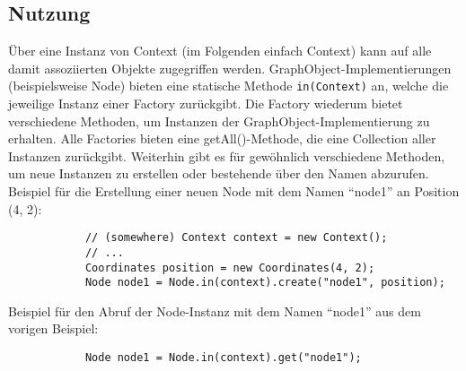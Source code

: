 \documentclass[accentcolor=tud0b,12pt,paper=a4]{tudreport}
\begin{document}
		\subsection{Nutzung}
			Über eine Instanz von Context (im Folgenden einfach Context) kann auf alle damit assoziierten Objekte zugegriffen werden.
			GraphObject-Implementierungen (beispielsweise Node) bieten eine statische Methode \texttt{in(Context)} an, welche die jeweilige Instanz einer Factory zurückgibt. Die Factory wiederum bietet verschiedene Methoden, um Instanzen der GraphObject-Implementierung zu erhalten. Alle Factories bieten eine getAll()-Methode, die eine Collection aller Instanzen zurückgibt. Weiterhin gibt es für gewöhnlich verschiedene Methoden, um neue Instanzen zu erstellen oder bestehende über den Namen abzurufen.\\
			
			Beispiel für die Erstellung einer neuen Node mit dem Namen "`node1"' an Position (4, 2):\\
			\begin{lstlisting}
			// (somewhere) Context context = new Context();
			// ...
			Coordinates position = new Coordinates(4, 2);
			Node node1 = Node.in(context).create("node1", position);		
			\end{lstlisting}
			
			Beispiel für den Abruf der Node-Instanz mit dem Namen "`node1"' aus dem vorigen Beispiel:\\
			\begin{lstlisting}	
			Node node1 = Node.in(context).get("node1");
			\end{lstlisting}
		
\end{document}
